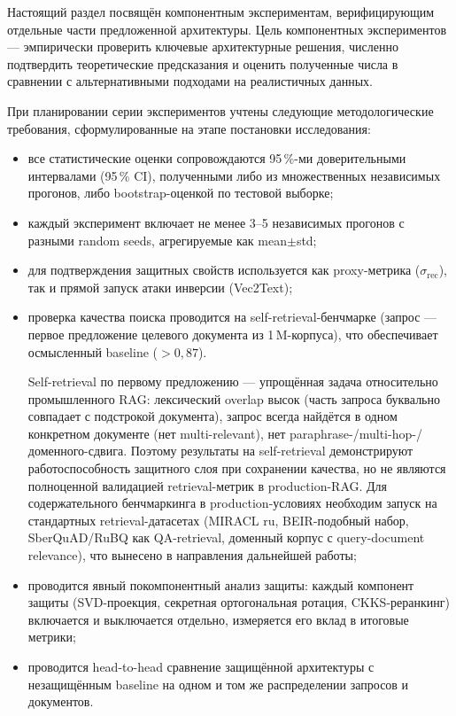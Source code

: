 \documentclass[a4paper, 12pt, oneside, openany]{article}
\begin{document}
Настоящий раздел посвящён компонентным экспериментам, верифицирующим отдельные части предложенной архитектуры. Цель компонентных экспериментов --- эмпирически проверить ключевые архитектурные решения, численно подтвердить теоретические предсказания и оценить полученные числа в сравнении с альтернативными подходами на реалистичных данных.

При планировании серии экспериментов учтены следующие методологические требования, сформулированные на этапе постановки исследования:
\begin{itemize}
	\item все статистические оценки сопровождаются 95\,\%-ми доверительными интервалами (95\,\% CI), полученными либо из множественных независимых прогонов, либо bootstrap-оценкой по тестовой выборке;
	\item каждый эксперимент включает не менее 3--5 независимых прогонов с разными random seeds, агрегируемые как mean$\pm$std;
	\item для подтверждения защитных свойств используется как proxy-метрика ($\sigma_{\mathrm{rec}}$), так и прямой запуск атаки инверсии (Vec2Text);
	\item проверка качества поиска проводится на self-retrieval-бенчмарке (запрос --- первое предложение целевого документа из 1\,M-корпуса), что обеспечивает осмысленный baseline ($> 0{,}87$).
	
	 Self-retrieval по первому предложению --- упрощённая задача относительно промышленного RAG: лексический overlap высок (часть запроса буквально совпадает с подстрокой документа), запрос всегда найдётся в одном конкретном документе (нет multi-relevant), нет paraphrase-/multi-hop-/доменного-сдвига. Поэтому результаты на self-retrieval демонстрируют работоспособность защитного слоя при сохранении качества, но не являются полноценной валидацией retrieval-метрик в production-RAG. Для содержательного бенчмаркинга в production-условиях необходим запуск на стандартных retrieval-датасетах (MIRACL ru, BEIR-подобный набор, SberQuAD/RuBQ как QA-retrieval, доменный корпус с query-document relevance), что вынесено в направления дальнейшей работы;
	\item проводится явный покомпонентный анализ защиты: каждый компонент защиты (SVD-проекция, секретная ортогональная ротация, CKKS-реранкинг) включается и выключается отдельно, измеряется его вклад в итоговые метрики;
	\item проводится head-to-head сравнение защищённой архитектуры с незащищённым baseline на одном и том же распределении запросов и документов.
\end{itemize}
\end{document}

